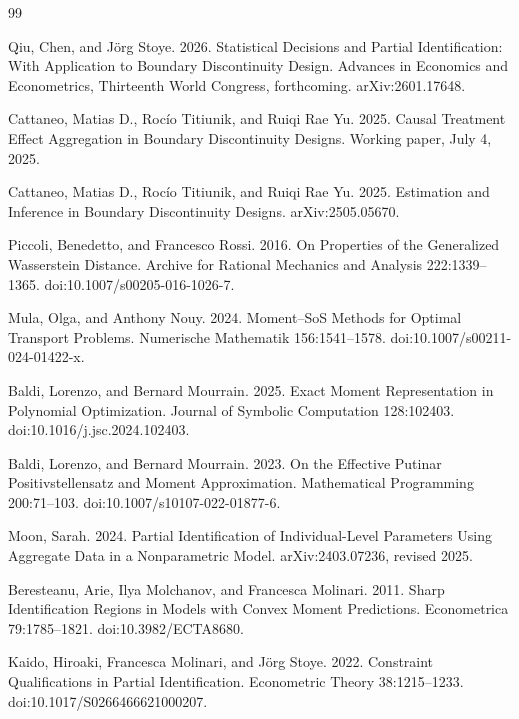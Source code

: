 \documentclass{article}
\begin{document}
\begin{thebibliography}{99}

   Qiu, Chen, and Jörg Stoye. 2026. Statistical Decisions and Partial Identification: With Application to Boundary Discontinuity Design. Advances in Economics and Econometrics, Thirteenth World Congress, forthcoming. arXiv:2601.17648.

   Cattaneo, Matias D., Rocío Titiunik, and Ruiqi Rae Yu. 2025. Causal Treatment Effect Aggregation in Boundary Discontinuity Designs. Working paper, July 4, 2025.

   Cattaneo, Matias D., Rocío Titiunik, and Ruiqi Rae Yu. 2025. Estimation and Inference in Boundary Discontinuity Designs. arXiv:2505.05670.

   Piccoli, Benedetto, and Francesco Rossi. 2016. On Properties of the Generalized Wasserstein Distance. Archive for Rational Mechanics and Analysis 222:1339--1365. doi:10.1007/s00205-016-1026-7.

   Mula, Olga, and Anthony Nouy. 2024. Moment--SoS Methods for Optimal Transport Problems. Numerische Mathematik 156:1541--1578. doi:10.1007/s00211-024-01422-x.

   Baldi, Lorenzo, and Bernard Mourrain. 2025. Exact Moment Representation in Polynomial Optimization. Journal of Symbolic Computation 128:102403. doi:10.1016/j.jsc.2024.102403.

   Baldi, Lorenzo, and Bernard Mourrain. 2023. On the Effective Putinar Positivstellensatz and Moment Approximation. Mathematical Programming 200:71--103. doi:10.1007/s10107-022-01877-6.

   Moon, Sarah. 2024. Partial Identification of Individual-Level Parameters Using Aggregate Data in a Nonparametric Model. arXiv:2403.07236, revised 2025.

   Beresteanu, Arie, Ilya Molchanov, and Francesca Molinari. 2011. Sharp Identification Regions in Models with Convex Moment Predictions. Econometrica 79:1785--1821. doi:10.3982/ECTA8680.

   Kaido, Hiroaki, Francesca Molinari, and Jörg Stoye. 2022. Constraint Qualifications in Partial Identification. Econometric Theory 38:1215--1233. doi:10.1017/S0266466621000207.


\end{thebibliography}
\end{document}
